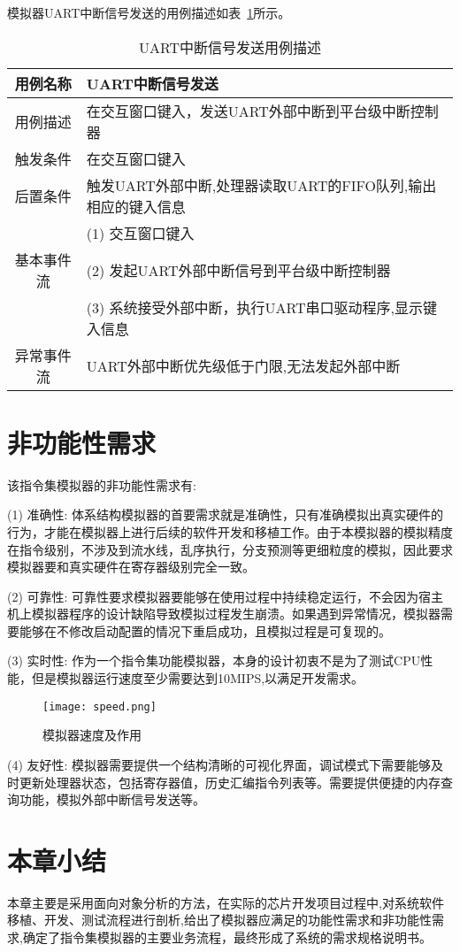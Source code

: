 模拟器UART中断信号发送的用例描述如表~\ref{tab:yongli5}所示。
\begin{table}[H]
  \centering
  \caption{UART中断信号发送用例描述}
  \label{tab:yongli5}
  \renewcommand\arraystretch{1.1}
  \begin{tabular}{cl}
    \toprule
用例名称 & UART中断信号发送\\
    \midrule
用例描述	& \multicolumn{1}{p{9cm}}{在交互窗口键入，发送UART外部中断到平台级中断控制器}\\ \hline
触发条件	& \multicolumn{1}{p{9cm}}{在交互窗口键入}\\ \hline
后置条件	& \multicolumn{1}{p{9cm}}{触发UART外部中断,处理器读取UART的FIFO队列,输出相应的键入信息}\\ \hline
 &	\multicolumn{1}{p{9cm}}{(1)	交互窗口键入}\\
 基本事件流 & \multicolumn{1}{p{9cm}}{(2)	发起UART外部中断信号到平台级中断控制器}\\
 & \multicolumn{1}{p{9cm}}{(3)	系统接受外部中断，执行UART串口驱动程序,显示键入信息}\\ \hline
异常事件流 &	\multicolumn{1}{p{9cm}}{UART外部中断优先级低于门限,无法发起外部中断}\\
    \bottomrule
  \end{tabular}
\end{table}


\section{非功能性需求}

该指令集模拟器的非功能性需求有:


(1) 准确性: 体系结构模拟器的首要需求就是准确性，只有准确模拟出真实硬件的行为，才能在模拟器上进行后续的软件开发和移植工作。由于本模拟器的模拟精度在指令级别，不涉及到流水线，乱序执行，分支预测等更细粒度的模拟，因此要求模拟器要和真实硬件在寄存器级别完全一致。


(2) 可靠性: 可靠性要求模拟器要能够在使用过程中持续稳定运行，不会因为宿主机上模拟器程序的设计缺陷导致模拟过程发生崩溃。如果遇到异常情况，模拟器需要能够在不修改启动配置的情况下重启成功，且模拟过程是可复现的。


(3) 实时性: 作为一个指令集功能模拟器，本身的设计初衷不是为了测试CPU性能，但是模拟器运行速度至少需要达到10MIPS,以满足开发需求。

\begin{figure}[H]
  \centering
  \texttt{[image: speed.png]}
  \caption{模拟器速度及作用}
  \label{fig:speed}
\end{figure}


(4) 友好性: 模拟器需要提供一个结构清晰的可视化界面，调试模式下需要能够及时更新处理器状态，包括寄存器值，历史汇编指令列表等。需要提供便捷的内存查询功能，模拟外部中断信号发送等。




\section{本章小结}

本章主要是采用面向对象分析的方法，在实际的芯片开发项目过程中,对系统软件移植、开发、测试流程进行剖析,给出了模拟器应满足的功能性需求和非功能性需求,确定了指令集模拟器的主要业务流程，最终形成了系统的需求规格说明书。


